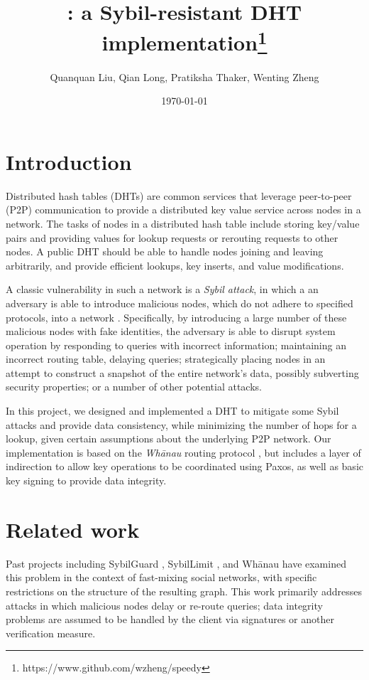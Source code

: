 \documentclass[letter]{article}
\title{\sys\!: a Sybil-resistant DHT implementation\footnote{https://www.github.com/wzheng/speedy}}
\author{Quanquan Liu, Qian Long, Pratiksha Thaker, Wenting Zheng}
\date{\today}
\begin{document}
\maketitle

\section{Introduction}

Distributed hash tables (DHTs) are common services that leverage peer-to-peer
(P2P) communication to provide a distributed key value service across nodes in a
network. The tasks of nodes in a distributed hash table include storing
key/value pairs and providing values for lookup requests or rerouting requests
to other nodes. A public DHT should be able to handle nodes joining and leaving
arbitrarily, and provide efficient lookups, key inserts, and value
modifications.

A classic vulnerability in such a network is a \textit{Sybil attack}, in
which a an adversary is able to introduce malicious nodes, which
do not adhere to specified
protocols, into a network . Specifically,
by introducing a large number of these malicious nodes with fake identities,
the adversary is able to
disrupt system operation by responding to queries with incorrect information;
maintaining an incorrect routing table, delaying queries;
strategically placing nodes in an attempt to construct a snapshot of the
entire network's data, possibly subverting security properties; or a
number of other potential attacks.

In this project, we designed and implemented a DHT to mitigate some
Sybil attacks and provide data consistency, while minimizing the number of hops
for a lookup, given certain assumptions about the underlying P2P network.
Our implementation is based on the \textit{Wh\={a}nau} routing protocol
\cite{whanau}, but includes a layer of indirection to allow key operations
to be coordinated using Paxos, as well as basic key signing to provide
data integrity.

\section{Related work}

Past projects including SybilGuard \cite{sybilguard}, SybilLimit \cite{sybillimit},
and Wh\={a}nau \cite{whanau} have examined this problem in the context
of fast-mixing social networks, with specific restrictions on the
structure of the resulting graph. This work primarily addresses attacks
in which malicious nodes delay or re-route queries; data integrity
problems are assumed to be handled by the client via signatures or another
verification measure.\\
\end{document}
